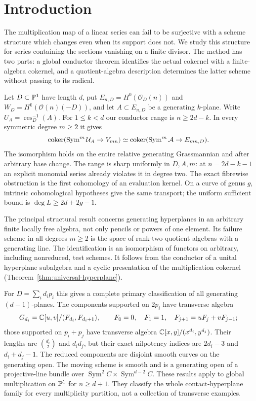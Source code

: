 \section{Introduction}
\label{sec:conductor-introduction}
The multiplication map of a linear series can fail to be surjective
with a scheme structure which changes even when its support does
not. We study this structure for series containing the sections
vanishing on a finite divisor. The method has two parts: a global
conductor theorem identifies the actual cokernel with a finite-algebra
cokernel, and a quotient-algebra description determines the latter
scheme without passing to its radical.

Let $D\subset\mathbb P^1$ have length $d$, put
$E_{n,D}=H^0(\mathcal O_D(n))$ and $W_D=H^0(\mathcal O(n)(-D))$,
and let $A\subset E_{n,D}$ be a generating $k$-plane. Write
$U_A=\operatorname{res}_D^{-1}(A)$. For $1\le k<d$ our conductor
range is $n\ge2d-k$. In every symmetric degree $m\ge2$ it gives
\begin{equation}\label{eq:intro-conductor-cokernel}
 \operatorname{coker}(\operatorname{Sym}^m\mathcal U_A\to V_{mn})
 \simeq\operatorname{coker}(\operatorname{Sym}^m\mathcal A\to E_{mn,D}).
\end{equation}
The isomorphism holds on the entire relative generating Grassmannian
and after arbitrary base change. The range is sharp uniformly in
$D,A,m$: at $n=2d-k-1$ an explicit monomial series already violates
it in degree two. The exact fibrewise obstruction is the first
cohomology of an evaluation kernel. On a curve of genus $g$, intrinsic
cohomological hypotheses give the same transport; the uniform
sufficient bound is $\deg L\ge2d+2g-1$.

The principal structural result concerns generating hyperplanes in
an arbitrary finite locally free algebra, not only pencils or powers
of one element. Its failure scheme in all degrees $m\ge2$ is the
space of rank-two quotient algebras with a generating line. The
identification is an isomorphism of functors on arbitrary, including
nonreduced, test schemes. It follows from the conductor of a unital
hyperplane subalgebra and a cyclic presentation of the multiplication
cokernel (Theorem~\ref{thm:universal-hyperplane}).

For $D=\sum_i d_i p_i$ this gives a complete primary classification
of all generating $(d-1)$-planes. The components supported on $2p_i$
have transverse algebra
\[
 G_{d_i}=\mathbb C[u,v]/(F_{d_i},F_{d_i+1}),\qquad
 F_0=0,\quad F_1=1,\quad F_{j+1}=uF_j+vF_{j-1};
\]
those supported on $p_i+p_j$ have transverse algebra
$\mathbb C[x,y]/(x^{d_i},y^{d_j})$. Their lengths are $\binom{d_i}2$
and $d_id_j$, but their exact nilpotency indices are $2d_i-3$ and
$d_i+d_j-1$. The reduced components are disjoint smooth curves on
the generating open. The moving scheme is smooth and is a generating
open of a projective-line bundle over
$\operatorname{Sym}^2 C\times\operatorname{Sym}^{d-2} C$.
These results apply to global multiplication on $\mathbb P^1$ for $n\ge d+1$.
They classify the whole contact-hyperplane family for every
multiplicity partition, not a collection of transverse examples.

